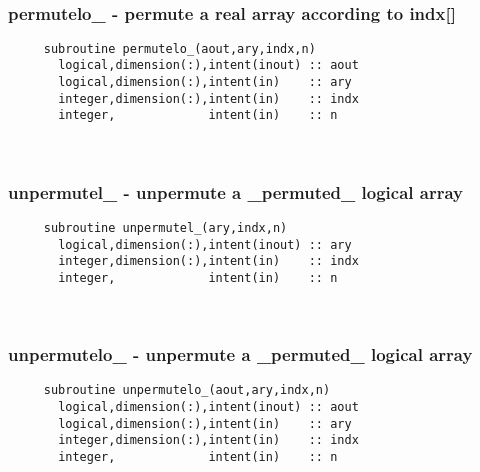  
\mbox{}\hrulefill\ 

  \subsubsection{permutelo\_ - permute a real array according to indx[]}

\begin{verbatim} 
     subroutine permutelo_(aout,ary,indx,n)
       logical,dimension(:),intent(inout) :: aout
       logical,dimension(:),intent(in)    :: ary
       integer,dimension(:),intent(in)    :: indx
       integer,             intent(in)    :: n
 \end{verbatim}%
 
 
\mbox{}\hrulefill\ 
 
  \subsubsection{unpermutel\_ - unpermute a \_permuted\_ logical array}

\begin{verbatim} 
     subroutine unpermutel_(ary,indx,n)
       logical,dimension(:),intent(inout) :: ary
       integer,dimension(:),intent(in)    :: indx
       integer,             intent(in)    :: n
 \end{verbatim}%
 
 
\mbox{}\hrulefill\ 
 
  \subsubsection{unpermutelo\_ - unpermute a \_permuted\_ logical array}

\begin{verbatim} 
     subroutine unpermutelo_(aout,ary,indx,n)
       logical,dimension(:),intent(inout) :: aout
       logical,dimension(:),intent(in)    :: ary
       integer,dimension(:),intent(in)    :: indx
       integer,             intent(in)    :: n
 \end{verbatim}%
 
